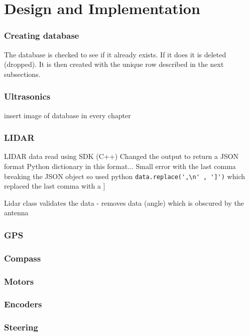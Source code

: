 \section{Design and Implementation}

\subsubsection{Creating database}
The database is checked to see if it already exists. If it does it is deleted (dropped). It is then created with the unique row described in the next subsections.

\subsubsection{Ultrasonics}
insert image of database in every chapter


\subsubsection{LIDAR}
\gls{LIDAR} data read using SDK (C++)
Changed the output to return a JSON format
Python dictionary in this format...
Small error with the last comma breaking the JSON object so used python \lstinline{data.replace(',\n' , ']')} which replaced the last comma with a ]

Lidar class validates the data
 - removes data (angle) which is obscured by the antenna


\subsubsection{GPS}

\subsubsection{Compass}

\subsubsection{Motors}

\subsubsection{Encoders}

\subsubsection{Steering}
